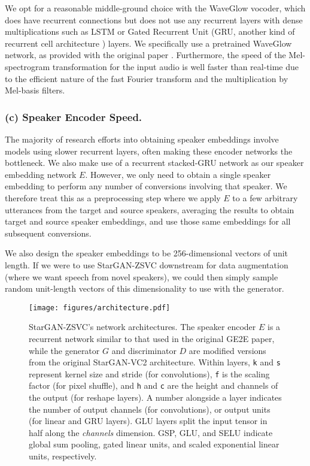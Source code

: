 We opt for a reasonable middle-ground choice with the WaveGlow vocoder, which does have recurrent connections but does not use any recurrent layers with dense multiplications such as LSTM or Gated Recurrent Unit (GRU, another kind of recurrent cell architecture \cite{gru}) layers. We specifically use a pretrained WaveGlow network, as provided with 
the original paper \cite{waveglow}. 
Furthermore, the speed of the Mel-spectrogram transformation for the input audio is well faster than real-time due to the efficient nature of the fast Fourier transform and the multiplication by Mel-basis filters.

\subsubsection{(c) Speaker Encoder Speed.} 
The majority of research efforts into obtaining speaker embeddings involve models using slower recurrent layers, often making these encoder networks the bottleneck. 
We also make use of a recurrent stacked-GRU network as our speaker embedding network $E$.
However, we only need to obtain a single speaker embedding to perform 
any number of conversions involving that speaker.
We therefore treat this as a preprocessing step where we apply $E$ to a few arbitrary utterances from the target and source speakers, averaging the results to obtain target and source speaker embeddings, and use those same embeddings for all subsequent conversions.

We also design the speaker embeddings to be 256-dimensional vectors of unit length. If we were to use StarGAN-ZSVC downstream for data augmentation (where we want speech from novel speakers), we could then simply sample random unit-length vectors of this dimensionality  to use with the generator.

\begin{figure}[!t]
\texttt{[image: figures/architecture.pdf]}
\caption{StarGAN-ZSVC's network architectures. The speaker encoder $E$ is a recurrent network similar to that used in the original GE2E paper, while the generator $G$ and discriminator $D$ are modified versions from the original StarGAN-VC2 architecture. Within layers, \texttt{k} and \texttt{s} represent kernel size and stride (for convolutions), \texttt{f} is the scaling factor (for pixel shuffle), and \texttt{h} and \texttt{c} are the height and channels of the output (for reshape layers). A number alongside a layer indicates the number of output channels (for convolutions), or output units (for linear and GRU layers). GLU layers split the input tensor in half along the \textit{channels} dimension. GSP, GLU, and SELU indicate global sum pooling, gated linear units, and scaled exponential linear units, respectively.} \label{fig:architecture}
\end{figure}

